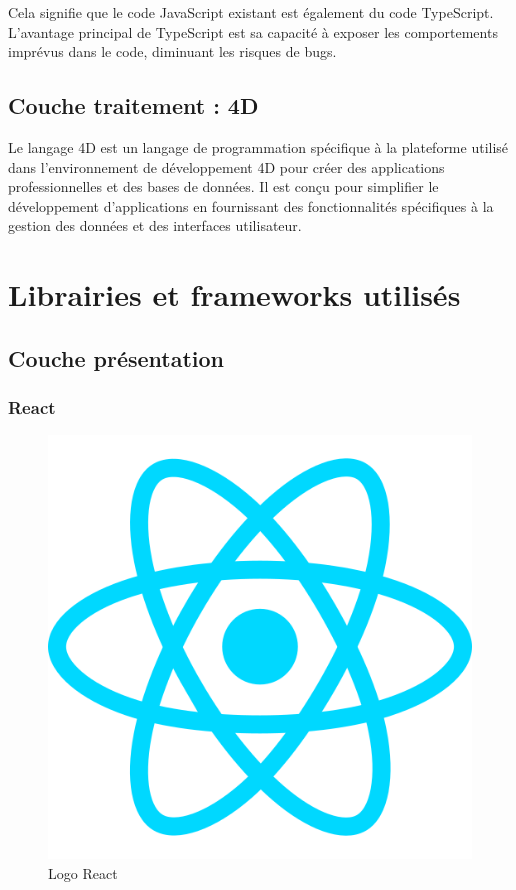 Cela signifie que le code JavaScript existant est également du code TypeScript. L’avantage principal de TypeScript est sa capacité à exposer les comportements imprévus dans le code, diminuant les risques de bugs.\cite{Typescript}

\subsection{Couche traitement : 4D}


Le langage 4D est un langage de programmation spécifique à la plateforme utilisé dans l’environnement de développement 4D pour créer des applications professionnelles et
des bases de données. Il est conçu pour simplifier le développement d’applications en fournissant des fonctionnalités
spécifiques à la gestion des données et des interfaces utilisateur.

\section{Librairies et frameworks utilisés}

\subsection{Couche présentation}

\subsubsection{React}


\begin{figure}[H]
    \centering
    \includegraphics[scale=0.2]{Logos/react.png}
    \caption{Logo React}
\end{figure}

